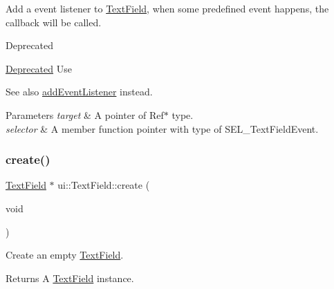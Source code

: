 Add a event listener to \hyperlink{classui_1_1TextField}{Text\+Field}, when some predefined event happens, the callback will be called. \begin{DoxyRefDesc}{Deprecated}
\item[\hyperlink{deprecated__deprecated000400}{Deprecated}]Use\end{DoxyRefDesc}
\begin{DoxySeeAlso}{See also}
{\ttfamily \hyperlink{classui_1_1TextField_a2fb48806ef4efd12c4d7db8f58956509}{add\+Event\+Listener}} instead. 
\end{DoxySeeAlso}

\begin{DoxyParams}{Parameters}
{\em target} & A pointer of {\ttfamily Ref$\ast$} type. \\
\hline
{\em selector} & A member function pointer with type of {\ttfamily S\+E\+L\+\_\+\+Text\+Field\+Event}. \\
\hline
\end{DoxyParams}
\mbox{\label{classui_1_1TextField_a3a140ed620e5704d472a9f5d3dc4c6ea}} 
\subsubsection{\texorpdfstring{create()}{create()}\hspace{0.1cm}{\footnotesize\ttfamily [1/4]}}
{\footnotesize\ttfamily \hyperlink{classui_1_1TextField}{Text\+Field} $\ast$ ui\+::\+Text\+Field\+::create (\begin{DoxyParamCaption}\item[{void}]{ }\end{DoxyParamCaption})\hspace{0.3cm}{\ttfamily [static]}}



Create an empty \hyperlink{classui_1_1TextField}{Text\+Field}. 

\begin{DoxyReturn}{Returns}
A \hyperlink{classui_1_1TextField}{Text\+Field} instance. 
\end{DoxyReturn}
\mbox{\label{classui_1_1TextField_a6af38c2128e1b7a625351076208fedd8}} 

